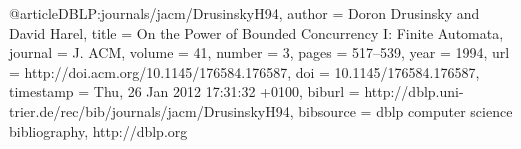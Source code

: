@article{DBLP:journals/jacm/DrusinskyH94,
  author    = {Doron Drusinsky and
               David Harel},
  title     = {On the Power of Bounded Concurrency {I:} Finite Automata},
  journal   = {J. {ACM}},
  volume    = {41},
  number    = {3},
  pages     = {517--539},
  year      = {1994},
  url       = {http://doi.acm.org/10.1145/176584.176587},
  doi       = {10.1145/176584.176587},
  timestamp = {Thu, 26 Jan 2012 17:31:32 +0100},
  biburl    = {http://dblp.uni-trier.de/rec/bib/journals/jacm/DrusinskyH94},
  bibsource = {dblp computer science bibliography, http://dblp.org}
}